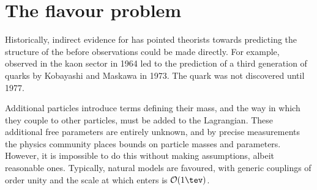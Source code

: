 \section{The flavour problem}

Historically, indirect evidence for \np has pointed theorists towards predicting the structure of
the \sm before observations could be made directly.
For example, \CPV observed in the kaon sector in 1964 led to the prediction of a third generation of
quarks by Kobayashi and Maskawa in 1973.
The \bquark quark was not discovered until 1977.







Additional \np particles introduce terms defining their mass, and the way in which they couple
to other particles, must be added to the Lagrangian.
These additional free parameters are entirely unknown, and by precise measurements the physics
community places bounds on \np particle masses and parameters.
However, it is impossible to do this without making assumptions, albeit reasonable ones.
Typically, natural models are favoured, with generic couplings of order unity and the
scale at which \np enters is $\mathcal{O}(1\tev)$.

